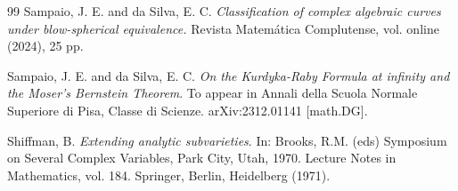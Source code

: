 \documentclass[a4paper,11pt]{amsart}
\begin{document}
\begin{thebibliography}{99}
{Sampaio, J. E. and da Silva, E. C.}
{\it Classification of complex algebraic curves under blow-spherical equivalence.}
Revista Matem\'atica Complutense, vol. online (2024), 25 pp.

{Sampaio, J. E. and da Silva, E. C.}
{\it On the Kurdyka-Raby Formula at infinity and the Moser's Bernstein Theorem}. 
To appear in Annali della Scuola Normale Superiore di Pisa, Classe di Scienze. arXiv:2312.01141 [math.DG]. 

{Shiffman, B.}
{\it  Extending analytic subvarieties}. In: Brooks, R.M. (eds) Symposium on Several Complex Variables, Park City, Utah, 1970. Lecture Notes in Mathematics, vol. 184. Springer, Berlin, Heidelberg (1971).

\end{thebibliography}
\end{document}
